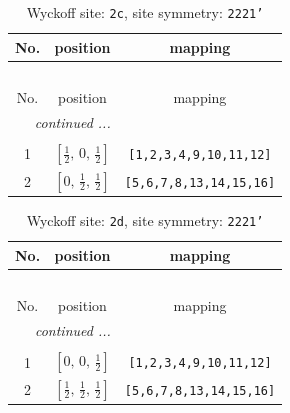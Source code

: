 \documentclass[fleqn,8pt]{jsarticle}
\begin{document}
\renewcommand{\arraystretch}{1.2}
\begin{longtable}{ccc}
\caption{Wyckoff site: {\tt 2c}, site symmetry: {\tt 2221'}}
 \\
 \hline \hline
No. & position & mapping \\ \hline \endfirsthead

\multicolumn{2}{l}{\tablename\ \thetable{}} \\
 \hline \hline
No. & position & mapping \\ \hline \endhead

 \hline \hline
\multicolumn{2}{r}{\footnotesize\it continued ...} \\ \endfoot

 \hline \hline
\multicolumn{2}{r}{} \\ \endlastfoot

1 & $\left[ \frac{1}{2},\, 0,\, \frac{1}{2} \right]$ & {\tt [1,2,3,4,9,10,11,12]} \\ \hline
2 & $\left[ 0,\, \frac{1}{2},\, \frac{1}{2} \right]$ & {\tt [5,6,7,8,13,14,15,16]} \\
\end{longtable}
\renewcommand{\arraystretch}{1.2}
\begin{longtable}{ccc}
\caption{Wyckoff site: {\tt 2d}, site symmetry: {\tt 2221'}}
 \\
 \hline \hline
No. & position & mapping \\ \hline \endfirsthead

\multicolumn{2}{l}{\tablename\ \thetable{}} \\
 \hline \hline
No. & position & mapping \\ \hline \endhead

 \hline \hline
\multicolumn{2}{r}{\footnotesize\it continued ...} \\ \endfoot

 \hline \hline
\multicolumn{2}{r}{} \\ \endlastfoot

1 & $\left[ 0,\, 0,\, \frac{1}{2} \right]$ & {\tt [1,2,3,4,9,10,11,12]} \\ \hline
2 & $\left[ \frac{1}{2},\, \frac{1}{2},\, \frac{1}{2} \right]$ & {\tt [5,6,7,8,13,14,15,16]} \\
\end{longtable}
\renewcommand{\arraystretch}{1.2}
\end{document}
